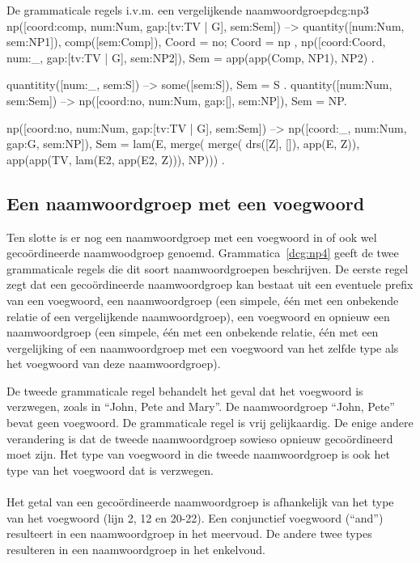 \begin{dcg}{De grammaticale regels i.v.m. een vergelijkende naamwoordgroep}{dcg:np3}
np([coord:comp, num:Num, gap:[tv:TV | G], sem:Sem]) -->
  quantity([num:Num, sem:NP1]),
  comp([sem:Comp]),
  { Coord = no; Coord = np },
  np([coord:Coord, num:_, gap:[tv:TV | G], sem:NP2]),
  { Sem = app(app(Comp, NP1), NP2) }.

quantitity([num:_, sem:S]) -->
  some([sem:S]),
  { Sem = S }.
quantity([num:Num, sem:Sem]) -->
  np([coord:no, num:Num, gap:[], sem:NP]),
  { Sem = NP}.

np([coord:no, num:Num, gap:[tv:TV | G], sem:Sem]) -->
  np([coord:_, num:Num, gap:G, sem:NP]),
  { Sem = lam(E, merge(
      merge(
        drs([Z], []),
        app(E, Z)),
      app(app(TV, lam(E2, app(E2, Z))), NP))) }.
\end{dcg}

\subsection{Een naamwoordgroep met een voegwoord}
Ten slotte is er nog een naamwoordgroep met een voegwoord in of ook wel gecoördineerde naamwoodgroep genoemd. Grammatica~\ref{dcg:np4} geeft de twee grammaticale regels die dit soort naamwoordgroepen beschrijven. De eerste regel zegt dat een gecoördineerde naamwoordgroep kan bestaat uit een eventuele prefix van een voegwoord, een naamwoordgroep (een simpele, één met een onbekende relatie of een vergelijkende naamwoordgroep), een voegwoord en opnieuw een naamwoordgroep (een simpele, één met een onbekende relatie, één met een vergelijking of een naamwoordgroep met een voegwoord van het zelfde type als het voegwoord van deze naamwoordgroep).

De tweede grammaticale regel behandelt het geval dat het voegwoord is verzwegen, zoals in ``John, Pete and Mary''. De naamwoordgroep ``John, Pete'' bevat geen voegwoord. De grammaticale regel is vrij gelijkaardig. De enige andere verandering is dat de tweede naamwoordgroep sowieso opnieuw gecoördineerd moet zijn. Het type van voegwoord in die tweede naamwoordgroep is ook het type van het voegwoord dat is verzwegen.

\paragraph{} Het getal van een gecoördineerde naamwoordgroep is afhankelijk van het type van het voegwoord (lijn 2, 12 en 20-22). Een conjunctief voegwoord (``and'') resulteert in een naamwoordgroep in het meervoud. De andere twee types resulteren in een naamwoordgroep in het enkelvoud.

